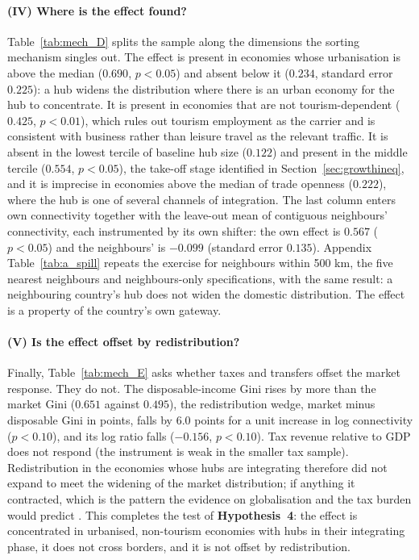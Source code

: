 \paragraph{(IV) Where is the effect found?}
Table~\ref{tab:mech_D} splits the sample along the dimensions the sorting mechanism singles out. The effect is present in economies whose urbanisation is above the median ($0.690$, $p<0.05$) and absent below it ($0.234$, standard error $0.225$): a hub widens the distribution where there is an urban economy for the hub to concentrate. It is present in economies that are not tourism-dependent ($0.425$, $p<0.01$), which rules out tourism employment as the carrier and is consistent with business rather than leisure travel as the relevant traffic. It is absent in the lowest tercile of baseline hub size ($0.122$) and present in the middle tercile ($0.554$, $p<0.05$), the take-off stage identified in Section~\ref{sec:growthineq}, and it is imprecise in economies above the median of trade openness ($0.222$), where the hub is one of several channels of integration. The last column enters own connectivity together with the leave-out mean of contiguous neighbours' connectivity, each instrumented by its own shifter: the own effect is $0.567$ ($p<0.05$) and the neighbours' is $-0.099$ (standard error $0.135$). Appendix Table~\ref{tab:a_spill} repeats the exercise for neighbours within 500 km, the five nearest neighbours and neighbours-only specifications, with the same result: a neighbouring country's hub does not widen the domestic distribution. The effect is a property of the country's own gateway.



\paragraph{(V) Is the effect offset by redistribution?}
Finally, Table~\ref{tab:mech_E} asks whether taxes and transfers offset the market response. They do not. The disposable-income Gini rises by more than the market Gini ($0.651$ against $0.495$), the redistribution wedge, market minus disposable Gini in points, falls by $6.0$ points for a unit increase in log connectivity ($p<0.10$), and its log ratio falls ($-0.156$, $p<0.10$). Tax revenue relative to GDP does not respond (the instrument is weak in the smaller tax sample). Redistribution in the economies whose hubs are integrating therefore did not expand to meet the widening of the market distribution; if anything it contracted, which is the pattern the evidence on globalisation and the tax burden would predict \citep{Egger_2019,Kleven_2013}. This completes the test of \textbf{Hypothesis~4}: the effect is concentrated in urbanised, non-tourism economies with hubs in their integrating phase, it does not cross borders, and it is not offset by redistribution.

